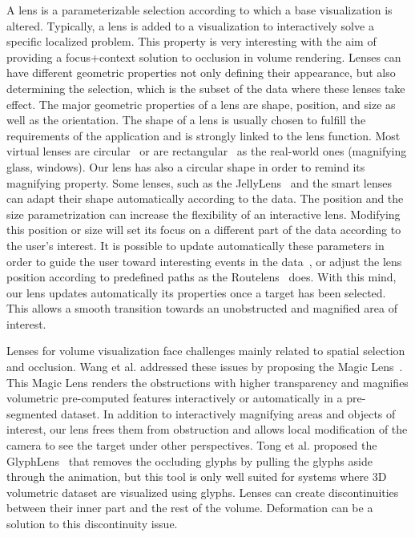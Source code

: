 A lens is a parameterizable selection according to which a base visualization is altered. Typically, a lens is added to a visualization to interactively solve a specific localized problem. This property is very interesting with the aim of providing a focus+context solution to occlusion in volume rendering. Lenses can have different geometric properties not only defining their appearance, but also determining the selection, which is the subset of the data where these lenses take effect. The major geometric properties of a lens are shape, position, and size as well as the orientation.
The shape of a lens is usually chosen to fulfill the requirements of the application and is strongly linked to the lens function. Most virtual lenses are circular~\cite{1648236} or are rectangular~\cite{Kincaid:2010:SFA:1907651.1907963} as the real-world ones (magnifying glass, windows). Our lens has also a circular shape in order to remind its magnifying property. Some lenses, such as the  JellyLens~\cite{Pindat:2012:JCA:2380116.2380150} and the smart lenses~\cite{Thiede2008} can adapt their shape automatically according to the data. 
The position and the size parametrization can increase the flexibility of an interactive lens.
Modifying this position or size will set its focus on a different part of the data according to the user's interest. It is possible to update automatically these parameters in order to guide the user toward interesting events in the data~\cite{Tominski:2011:ECU:2336207.2336211}, or adjust the lens position according to predefined paths as the Routelens~\cite{Alvina:2014:RER:2598153.2598200} does. With this mind, our lens updates automatically its properties once a target has been selected. This allows a smooth transition towards an unobstructed and magnified area of interest. 

Lenses for volume visualization face challenges mainly related to spatial selection and occlusion. Wang et al. addressed these issues by proposing the Magic Lens~\cite{1532818}. This Magic Lens renders the obstructions with higher transparency and magnifies volumetric pre-computed features interactively or automatically in a pre-segmented dataset. In addition to interactively magnifying areas and objects of interest, our lens frees them from obstruction and allows local modification of the camera to see the target under other perspectives. Tong et al. proposed the GlyphLens~\cite{7539643} that removes the occluding glyphs by pulling the glyphs aside through the animation, but this tool is only well suited for systems where 3D volumetric dataset are visualized using glyphs. Lenses can create discontinuities between their inner part and the rest of the volume. Deformation can be a solution to this discontinuity issue.   

